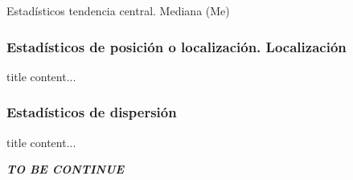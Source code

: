 \documentclass[11pt]{beamer}
\begin{document}
        \begin{frame}{Estadísticos tendencia central. Mediana (Me)}

        \end{frame}







      \subsubsection*{Estadísticos de posición o localización. Localización}
        \begin{frame}{title}
          content...
        \end{frame}

      \subsubsection*{Estadísticos de dispersión}
        \begin{frame}{title}
          content...
        \end{frame}




    \begin{frame}
      \centering
      \textit{\textbf{ \huge  TO BE CONTINUE}}
    \end{frame}
\end{document}
